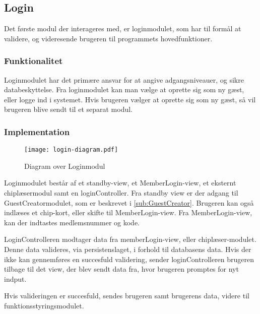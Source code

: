 \subsection{Login}
\label{sub:login}

Det første modul der interageres med, er loginmodulet, som har til formål at validere, og videresende brugeren til programmets hovedfunktioner.

\subsubsection{Funktionalitet}
\label{ssub:login_funktionalitet}

Loginmodulet har det primære ansvar for at angive adgangsniveauer, og sikre databeskyttelse. Fra loginmodulet kan man vælge at oprette sig som ny gæst, eller logge ind i systemet. Hvis brugeren vælger at oprette sig som ny gæst, så vil brugeren blive sendt til et separat modul.

\subsubsection{Implementation}
\label{ssub:login_implementation}

\begin{figure}
  \centering
  \texttt{[image: login-diagram.pdf]}
  \caption{Diagram over Loginmodul}
\end{figure}

Loginmodulet består af et standby-view, et MemberLogin-view, et eksternt chiplæsermodul samt en loginController. Fra standby view er der adgang til GuestCreatormodulet, som er beskrevet i \cref{sub:GuestCreator}. Brugeren kan også indlæses et chip-kort, eller skifte til MemberLogin-view. Fra MemberLogin-view, kan der indtastes medlemsnummer og kode.

LoginControlleren modtager data fra memberLogin-view, eller chiplæser-modulet. Denne data valideres, via persistenslaget, i forhold til databasens data. Hvis der ikke kan gennemføres en succesfuld validering, sender loginControlleren brugeren tilbage til det view, der blev sendt data fra, hvor brugeren promptes for nyt indput.

Hvis valideringen er succesfuld, sendes brugeren samt brugerens data, videre til funktionsstyringsmodulet.
